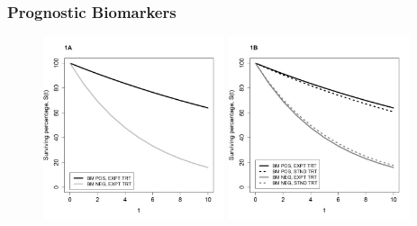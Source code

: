 \documentclass{beamer}
\begin{document}
    \begin{frame}
    \frametitle{Prognostic Biomarkers}
    
    \begin{figure}
        \includegraphics[width=0.475\textwidth]{prognostic.jpg}
        \hfill
        \includegraphics[width=0.475\textwidth]{prognostic2.jpg}
     \end{figure}
    
    \end{frame}
    
\end{document}
